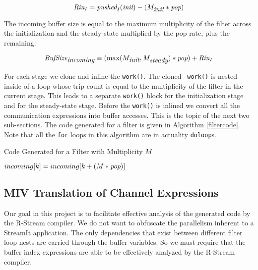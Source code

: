 \documentclass[10pt, letterpaper, onecolumn]{article}
\begin{document}
\begin{displaymath}
  \mbox{\it Rin}_I = \mbox{\it pushed}_I(\mbox{\it init}) - (M_{\mbox{\it init}} * \mbox{\it pop})
\end{displaymath}

The incoming buffer size is equal to the maximum multiplicity of the
filter across the initialization and the steady-state multiplied by
the pop rate, plus the remaining:

\begin{displaymath}
\mbox{\it BufSize}_{\mbox{\it incoming}} \equiv (\max(M_{\mbox{\it init}}, M_{\mbox{\it steady}}) * \mbox{\it pop}) + \mbox{\it Rin}_I
\end{displaymath}

For each stage we clone and inline the {\tt work()}.  The cloned {\tt
work()} is nested inside of a loop whose trip count is equal to the
multiplicity of the filter in the current stage.  This leads to a
separate {\tt work()} block for the initialization stage and for the
steady-state stage.  Before the {\tt work()} is inlined we convert all
the communication expressions into buffer accesses.  This is the topic
of the next two sub-sections. The code generated for a filter is given
in Algorithm \ref{filtercode}.  Note that all the {\tt for} loops in this
algorithm are in actuality {\tt doloop}s.



\begin{algorithm}
\caption{Code Generated for a Filter with Multiplicity $M$}
\label{filtercode}
\begin{algorithmic}
\ENDFOR
{}
\STATE ${incoming}[k] = {incoming}[k + (M * \mbox{\it pop})]$
\ENDFOR 
\end{algorithmic}
\end{algorithm}

\subsection{MIV Translation of Channel Expressions}
\label{miv}
Our goal in this project is to facilitate effective analysis of the
generated code by the R-Stream compiler.  We do not want to obfuscate
the parallelism inherent to a StreamIt application.  The only
dependencies that exist between different filter loop nests are
carried through the buffer variables.  So we must require that the
buffer index expressions are able to be effectively analyzed by the
R-Stream compiler.
\end{document}
